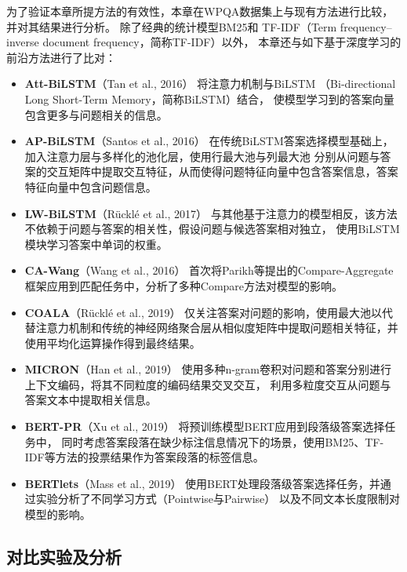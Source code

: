 为了验证本章所提方法的有效性，本章在WPQA数据集上与现有方法进行比较，并对其结果进行分析。
除了经典的统计模型BM25\cite{robertson1994some}和
TF-IDF（Term frequency–inverse document frequency，简称TF-IDF）\cite{ramos2003using}以外，
本章还与如下基于深度学习的前沿方法进行了比对：
\begin{itemize}
    \item \textbf{Att-BiLSTM}（Tan et al., 2016）\cite{tan2016improved}
    将注意力机制与BiLSTM （Bi-directional Long Short-Term Memory，简称BiLSTM）结合，
    使模型学习到的答案向量包含更多与问题相关的信息。
    \item \textbf{AP-BiLSTM}（Santos et al., 2016）\cite{santos2016attentive}
    在传统BiLSTM答案选择模型基础上，加入注意力层与多样化的池化层，使用行最大池与列最大池
    分别从问题与答案的交互矩阵中提取交互特征，从而使得问题特征向量中包含答案信息，答案特征向量中包含问题信息。
    \item \textbf{LW-BiLSTM}（Rücklé et al., 2017）\cite{ruckle2017representation}
    与其他基于注意力的模型相反，该方法不依赖于问题与答案的相关性，假设问题与候选答案相对独立，
    使用BiLSTM模块学习答案中单词的权重。
    \item \textbf{CA-Wang}（Wang et al., 2016）\cite{parikh2016decomposable}
    首次将Parikh等提出的Compare-Aggregate框架应用到匹配任务中，分析了多种Compare方法对模型的影响。
    \item \textbf{COALA}（Rücklé et al., 2019）\cite{ruckle2019coala}
    仅关注答案对问题的影响，使用最大池以代替注意力机制和传统的神经网络聚合层从相似度矩阵中提取问题相关特征，并使用平均化运算操作得到最终结果。
    \item \textbf{MICRON}（Han et al., 2019）\cite{han2019micron}
    使用多种n-gram卷积对问题和答案分别进行上下文编码，将其不同粒度的编码结果交叉交互，
    利用多粒度交互从问题与答案文本中提取相关信息。
    \item \textbf{BERT-PR}（Xu et al., 2019）\cite{xu2019passage}
    将预训练模型BERT应用到段落级答案选择任务中，
    同时考虑答案段落在缺少标注信息情况下的场景，使用BM25、TF-IDF等方法的投票结果作为答案段落的标签信息。
    \item \textbf{BERTlets}（Mass et al., 2019）\cite{mass2019study}
    使用BERT处理段落级答案选择任务，并通过实验分析了不同学习方式（Pointwise与Pairwise）
    以及不同文本长度限制对模型的影响。
\end{itemize}

\subsection{对比实验及分析}

